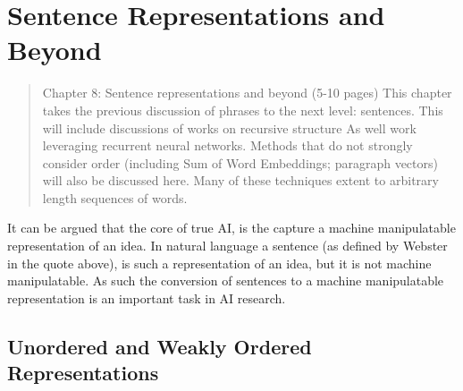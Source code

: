 \documentclass[12pt,parskip]{komatufte}
\begin{document}
\chapter{Sentence Representations and Beyond}\label{sec:sentence-representations-and-beyond}
\begin{abstract}
	Chapter 8: Sentence representations and beyond (5-10 pages)
	This chapter takes the previous discussion of phrases to the next level: sentences.
	This will include discussions of works on recursive structure
	As well work leveraging recurrent neural networks.
	Methods that do not strongly consider order (including Sum of Word Embeddings; paragraph vectors) will also be discussed here.
	Many of these techniques extent to arbitrary length sequences of words.
\end{abstract}



It can be argued that the core of true AI,
is the capture a machine manipulatable representation of an idea.
In natural language a sentence (as defined by Webster in the quote above),
is such a representation of an idea, but it is not machine manipulatable.
As such the conversion of sentences to a machine manipulatable representation is an important task in AI research.


\section{Unordered and Weakly Ordered Representations}
\end{document}
